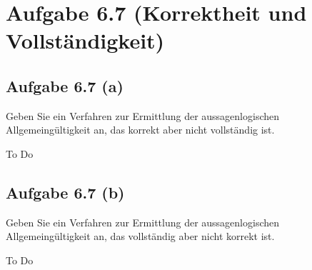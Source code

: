 \documentclass[12pt,a4paper]{article}
\begin{document}
\section*{Aufgabe 6.7 (Korrektheit und Vollständigkeit)}
\subsection*{Aufgabe 6.7 (a)}
Geben Sie ein Verfahren zur Ermittlung der aussagenlogischen Allgemeingültigkeit
an, das korrekt aber nicht vollständig ist.

\begin{lösung}
To Do 
\end{lösung}

\subsection*{Aufgabe 6.7 (b)}
Geben Sie ein Verfahren zur Ermittlung der aussagenlogischen Allgemeingültigkeit
an, das vollständig aber nicht korrekt ist.

\begin{lösung}
To Do
\end{lösung}
\end{document}
